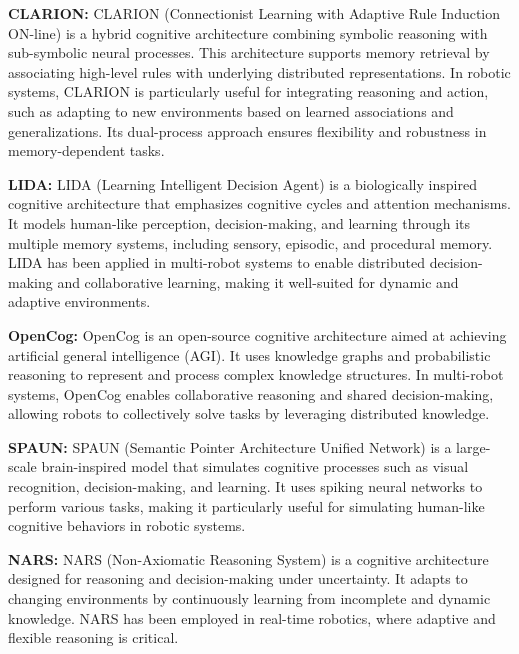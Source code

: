             \textbf{CLARION:} CLARION (Connectionist Learning with Adaptive Rule Induction ON-line) is a hybrid cognitive architecture combining symbolic reasoning with sub-symbolic neural processes. This architecture supports memory retrieval by associating high-level rules with underlying distributed representations. In robotic systems, CLARION is particularly useful for integrating reasoning and action, such as adapting to new environments based on learned associations and generalizations. Its dual-process approach ensures flexibility and robustness in memory-dependent tasks. \cite{sun-2006-clarion-framework}

            \textbf{LIDA:} LIDA (Learning Intelligent Decision Agent) is a biologically inspired cognitive architecture that emphasizes cognitive cycles and attention mechanisms. It models human-like perception, decision-making, and learning through its multiple memory systems, including sensory, episodic, and procedural memory. LIDA has been applied in multi-robot systems to enable distributed decision-making and collaborative learning, making it well-suited for dynamic and adaptive environments. \cite{franklin-2013-lida-a-systems-level-theory-of-cognition-and-action}

            \textbf{OpenCog:} OpenCog is an open-source cognitive architecture aimed at achieving artificial general intelligence (AGI). It uses knowledge graphs and probabilistic reasoning to represent and process complex knowledge structures. In multi-robot systems, OpenCog enables collaborative reasoning and shared decision-making, allowing robots to collectively solve tasks by leveraging distributed knowledge. \cite{goertzel-2014-the-opencog-framework-for-artificial-general-intelligence}
            
            \textbf{SPAUN:} SPAUN (Semantic Pointer Architecture Unified Network) is a large-scale brain-inspired model that simulates cognitive processes such as visual recognition, decision-making, and learning. It uses spiking neural networks to perform various tasks, making it particularly useful for simulating human-like cognitive behaviors in robotic systems. \cite{eliasmith-2012-a-large-scale-model-of-the-functioning-brain}
            
            \textbf{NARS:} NARS (Non-Axiomatic Reasoning System) is a cognitive architecture designed for reasoning and decision-making under uncertainty. It adapts to changing environments by continuously learning from incomplete and dynamic knowledge. NARS has been employed in real-time robotics, where adaptive and flexible reasoning is critical. \cite{wang-2006-non-axiomatic-reasoning-system}
            
